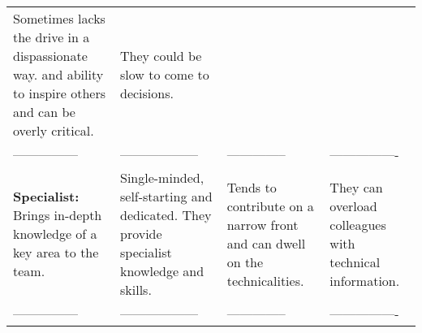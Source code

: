 \documentclass[]{book}
\begin{document}
\begin{longtable}[]{@{}llll@{}}
\begin{minipage}[t]{0.20\columnwidth}
Sometimes lacks the drive in a dispassionate way. and ability to inspire others and can be overly critical.\strut
\end{minipage} & \begin{minipage}[t]{0.22\columnwidth}\raggedright
They could be slow to come to decisions.\strut
\end{minipage}\tabularnewline
\begin{minipage}[t]{0.21\columnwidth}\raggedright
---------------\strut
\end{minipage} & \begin{minipage}[t]{0.25\columnwidth}\raggedright
------------------\strut
\end{minipage} & \begin{minipage}[t]{0.20\columnwidth}\raggedright
--------------\strut
\end{minipage} & \begin{minipage}[t]{0.22\columnwidth}\raggedright
----------------\strut
\end{minipage}\tabularnewline
\begin{minipage}[t]{0.21\columnwidth}\raggedright
\textbf{Specialist:} Brings in-depth knowledge of a key area to the team.\strut
\end{minipage} & \begin{minipage}[t]{0.25\columnwidth}\raggedright
Single-minded, self-starting and dedicated. They provide specialist knowledge and skills.\strut
\end{minipage} & \begin{minipage}[t]{0.20\columnwidth}\raggedright
Tends to contribute on a narrow front and can dwell on the technicalities.\strut
\end{minipage} & \begin{minipage}[t]{0.22\columnwidth}\raggedright
They can overload colleagues with technical information.\strut
\end{minipage}\tabularnewline
\begin{minipage}[t]{0.21\columnwidth}\raggedright
---------------\strut
\end{minipage} & \begin{minipage}[t]{0.25\columnwidth}\raggedright
------------------\strut
\end{minipage} & \begin{minipage}[t]{0.20\columnwidth}\raggedright
--------------\strut
\end{minipage} & \begin{minipage}[t]{0.22\columnwidth}\raggedright
----------------\strut

\end{minipage}
\end{longtable}
\end{document}
